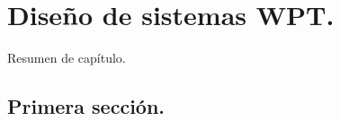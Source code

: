 \chapter{Diseño de sistemas WPT.}
\label{ch:proy}
Resumen de capítulo.

\section{Primera sección.}
	\label{sec:asdasd}



